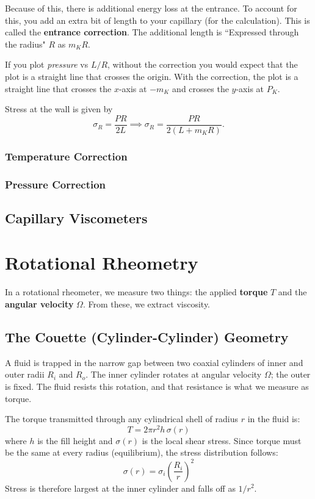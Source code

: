 Because of this, there is additional energy loss at the entrance. To account for this, you add an extra bit of length to your capillary (for the calculation). This is called the \textbf{entrance correction}. The additional length is ``Expressed through the radius" $R$ as $m_K R$.

If you plot \emph{pressure} vs $L/R$, without the correction you would expect that the plot is a straight line that crosses the origin. With the correction, the plot is a straight line that crosses the $x$-axis at $-m_K$ and crosses the $y$-axis at $P_K$.

Stress at the wall is given by
\[
	\sigma_R = \frac{PR}{2L}
	\implies
	\sigma_R = \frac{PR}{2(L + m_K R)}.
\]

\subsubsection{Temperature Correction}
\subsubsection{Pressure Correction}
\subsection{Capillary Viscometers}

\section{Rotational Rheometry}

In a rotational rheometer, we measure two things: the applied \textbf{torque} $T$ 
and the \textbf{angular velocity} $\Omega$. From these, we extract viscosity.

\subsection{The Couette (Cylinder-Cylinder) Geometry}

A fluid is trapped in the narrow gap between two coaxial cylinders of inner and 
outer radii $R_i$ and $R_o$. The inner cylinder rotates at angular velocity $\Omega$; 
the outer is fixed. The fluid resists this rotation, and that resistance is what 
we measure as torque.

The torque transmitted through any cylindrical shell of radius $r$ in the fluid is:
\begin{equation}
    T = 2\pi r^2 h\, \sigma(r)
\end{equation}
where $h$ is the fill height and $\sigma(r)$ is the local shear stress. Since torque 
must be the same at every radius (equilibrium), the stress distribution follows:
\begin{equation}
    \sigma(r) = \sigma_i \left(\frac{R_i}{r}\right)^2
\end{equation}
Stress is therefore largest at the inner cylinder and falls off as $1/r^2$.

